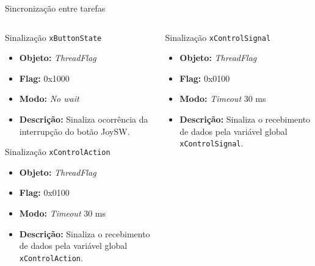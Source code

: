 \documentclass{if-beamer}
\begin{document}
\begin{frame}{Sincronização entre tarefas}
	
	\begin{columns}
		
		\begin{column}{0.5\textwidth}
			
				\begin{block}{Sinalização \texttt{xButtonState}}
				
				\begin{itemize}
					\item \textbf{Objeto:} \textit{ThreadFlag}
					\item \textbf{Flag:} 0x1000
					\item \textbf{Modo:} \textit{No wait}
					\item \textbf{Descrição:} Sinaliza ocorrência da interrupção do botão JoySW.
					
				\end{itemize}
				
			\end{block}
	

			\begin{block}{Sinalização \texttt{xControlAction}}
			
			\begin{itemize}
				\item \textbf{Objeto:} \textit{ThreadFlag}
				\item \textbf{Flag:} 0x0100
				\item \textbf{Modo:} \textit{Timeout} 30 ms
				\item \textbf{Descrição:} Sinaliza o recebimento de dados pela variável global \texttt{xControlAction}.
				
			\end{itemize}	
			
			\end{block}
			
		\end{column}
		
		\begin{column}{0.5\textwidth}
			
			\begin{block}{Sinalização \texttt{xControlSignal}}
				
				\begin{itemize}
					\item \textbf{Objeto:} \textit{ThreadFlag}
					\item \textbf{Flag:} 0x0100
					\item \textbf{Modo:} \textit{Timeout} 30 ms
					\item \textbf{Descrição:} Sinaliza o recebimento de dados pela variável global \texttt{xControlSignal}.
					
				\end{itemize}	
				
			\end{block}
			
		\end{column}
		
	\end{columns}
	
\end{frame}
\end{document}
